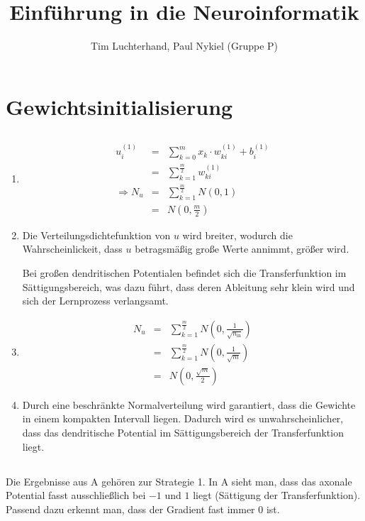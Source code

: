\documentclass[DIN, pagenumber=false, fontsize=11pt, parskip=half]{scrartcl}
\title{Einführung in die Neuroinformatik}
\author{Tim Luchterhand, Paul Nykiel (Gruppe P)}
\begin{document}
    \maketitle
    \section{Gewichtsinitialisierung}
    \subsection{}
    \begin{enumerate}[label=(\alph*)]
        \item 
            \begin{eqnarray*}
                u_i^{(1)} &=& \sum_{k=0}^m x_k \cdot w_{ki}^{(1)} + b_i^{(1)} \\
                &=& \sum_{k=1}^{\frac{m}{2}} w_{ki}^{(1)} \\
                \Rightarrow N_u &=& \sum_{k=1}^{\frac{m}{2}} N(0,1) \\
                &=& N\left(0, \frac{m}{2}\right)
            \end{eqnarray*}
        \item Die Verteilungsdichtefunktion von $u$ wird breiter, wodurch die Wahrscheinlickeit, dass $u$ betragsmäßig große Werte annimmt, größer wird.

            Bei großen dendritischen Potentialen befindet sich die Transferfunktion im Sättigungsbereich, was dazu führt, dass deren Ableitung sehr klein wird und sich der Lernprozess verlangsamt.
        \item 
            \begin{eqnarray*}
                N_u &=& \sum_{k=1}^{\frac{m}{2}} N\left(0,\frac{1}{\sqrt{n_\text{in}}}\right) \\
                &=& \sum_{k=1}^{\frac{m}{2}} N\left(0,\frac{1}{\sqrt{m}}\right) \\
                &=& N\left(0, \frac{\sqrt{m}}{2}\right)
            \end{eqnarray*}
        \item 
            Durch eine beschränkte Normalverteilung wird garantiert, dass die Gewichte in einem kompakten Intervall liegen. Dadurch wird es unwahrscheinlicher, dass das dendritische Potential im Sättigungsbereich der Transferfunktion liegt.
    \end{enumerate}

    \subsection{}
    Die Ergebnisse aus A gehören zur Strategie 1. In A sieht man, dass das axonale Potential fasst ausschließlich bei $-1$ und $1$ liegt (Sättigung der Transferfunktion). Passend dazu erkennt man, dass der Gradient fast immer $0$ ist. 
\end{document}

